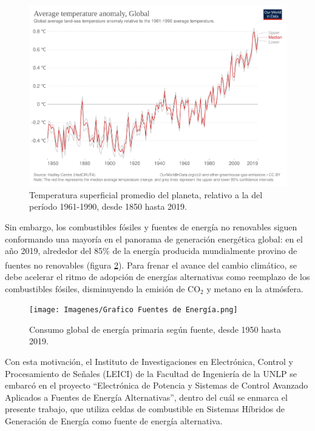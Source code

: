\begin{figure}[h]
    \centering
    \includegraphics[scale=0.11]{Imagenes/Grafico Temperatura.png}
    \caption{Temperatura superficial promedio del planeta, relativo a la del período 1961-1990, desde 1850 hasta 2019.}
    \label{Temp_Tierra}
\end{figure}

Sin embargo, los combustibles fósiles y fuentes de energía no renovables siguen conformando una mayoría en el panorama de generación energética global: en el año 2019, alrededor del 85\% de la energía producida mundialmente provino de fuentes no renovables (figura \ref{Emisiones_CO2}).\textsuperscript{\cite{ProdEnergia}} Para frenar el avance del cambio climático, se debe acelerar el ritmo de adopción de energías alternativas como reemplazo de los combustibles fósiles, disminuyendo la emisión de CO$_2$ y metano en la atmósfera.\\

\begin{figure}[h]
    \centering
    \texttt{[image: Imagenes/Grafico Fuentes de Energía.png]}
    \caption{Consumo global de energía primaria según fuente, desde 1950 hasta 2019.}
    \label{Emisiones_CO2}
\end{figure}

Con esta motivación, el Instituto de Investigaciones en Electrónica, Control y Procesamiento de Señales (LEICI) de la Facultad de Ingeniería de la UNLP se embarcó en el proyecto ``Electrónica de Potencia y Sistemas de Control Avanzado Aplicados a Fuentes de Energía Alternativas'', dentro del cuál se enmarca el presente trabajo, que utiliza celdas de combustible en Sistemas Híbridos de Generación de Energía como fuente de energía alternativa.\\

